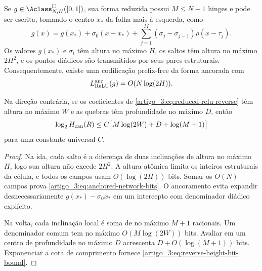 \begin{proposition}\label{map:artigo_3:5.4}
\label{artigo_3:prop:anchored-relu-code}
Se $g\in\Aclass^\square_{N,H}([0,1])$, sua forma reduzida possui
$M\le N-1$ hinges e pode ser escrita, tomando o centro $x_*$ da folha mais à
esquerda, como
\begin{equation}
 g(x)=g(x_*)+\sigma_0(x-x_*)
      +\sum_{j=1}^{M}(\sigma_j-\sigma_{j-1})\rho(x-\tau_j).
 \label{artigo_3:eq:anchored-relu-form}
\end{equation}
Os valores $g(x_*)$ e $\sigma_i$ têm altura no máximo $H$, os saltos têm
altura no máximo $2H^2$, e os pontos diádicos são transmitidos por seus pares
estruturais. Consequentemente, existe uma codificação prefix-free da forma
ancorada com
\begin{equation}
 L_{\rm ReLU}^{\rm anc}(g)=O(N\log(2H)).
 \label{artigo_3:eq:anchored-network-bits}
\end{equation}

Na direção contrária, se os coeficientes de
\eqref{artigo_3:eq:reduced-relu-reverse} têm altura no máximo $W$ e as quebras têm
profundidade no máximo $D$, então
\begin{equation}
 \log_2 H_{\rm can}(R)
 \le C\bigl[M\log(2W)+D+\log(M+1)\bigr]
 \label{artigo_3:eq:reverse-height-bit-bound}
\end{equation}
para uma constante universal $C$.
\end{proposition}

\begin{proof}
Na ida, cada salto é a diferença de duas inclinações de altura no máximo
$H$, logo sua altura não excede $2H^2$. A altura atômica limita os inteiros
estruturais da célula, e todos os campos usam $O(\log(2H))$ bits. Somar os
$O(N)$ campos prova \eqref{artigo_3:eq:anchored-network-bits}. O ancoramento evita
expandir desnecessariamente $g(x_*)-\sigma_0x_*$ em um intercepto com
denominador diádico explícito.

Na volta, cada inclinação local é soma de no máximo $M+1$ racionais. Um
denominador comum tem no máximo $O(M\log(2W))$ bits. Avaliar em um centro de
profundidade no máximo $D$ acrescenta $D+O(\log(M+1))$ bits. Exponenciar a
cota de comprimento fornece \eqref{artigo_3:eq:reverse-height-bit-bound}.
\end{proof}
